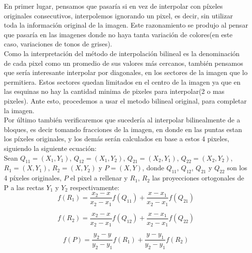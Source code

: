 \documentclass[a4paper]{article}
\newcounter{col}
\begin{document}
En primer lugar, pensamos que pasar\'ia si en vez de interpolar con p\'ixeles originales consecutivos, interpolemos ignorando un pixel, es decir, sin utilizar toda la informaci\'on original de la imagen. Este razonamiento se produjo al pensar que pasar\'ia en las imagenes donde no haya tanta variaci\'on de colores(en este caso, variaciones de tonos de grises).\\
Como la interpretaci\'on del  m\'etodo de interpolaci\'on bilineal es la denominaci\'on de cada pixel como un promedio de sus valores m\'as cercanos, tambi\'en pensamos que ser\'ia interesante interpolar por diagonales, en los sectores de la imagen que lo permitiera. Estos sectores quedan limitados en el centro de la imagen ya que en las esquinas no hay la cantidad minima de pixeles para interpolar(2 o mas pixeles). Ante esto, procedemos a usar el metodo bilineal original, para completar la imagen.\\
Por \'ultimo tambi\'en verificaremos que suceder\'ia al interpolar bilinealmente de a bloques, es decir tomando fracciones de la imagen, en donde en las puntas estan los p\'ixeles originales, y los dem\'as ser\'an calculados en base a estos 4 pixeles, siguiendo la siguiente ecuaci\'on:\\
Sean $Q_{11}=(X_1,Y_1)$, $Q_{12}=(X_1,Y_2)$, $Q_{21}=(X_2,Y_1)$, $Q_{22}=(X_2,Y_2)$, $R_1=(X,Y_1)$, $R_2=(X,Y_2)$ y $P=(X,Y)$, donde $Q_{11}$, $Q_{12}$, $Q_{21}$ y $Q_{22}$ son los 4 p\'ixeles originales, $P$ el pixel a rellenar y $R_1$, $R_2$ las proyecciones ortogonales de P a las rectas $Y_1$ y $Y_2$ respectivamente:\\

\begin{equation}
\texttt{}f(R_1) = \frac{x_2-x}{x_2-x_1} f(Q_{11}) + \frac{x-x_1}{x_2-x_1} f(Q_{21})
\end{equation}

\begin{equation}
\texttt{}f(R_2) = \frac{x_2-x}{x_2-x_1} f(Q_{12}) + \frac{x-x_1}{x_2-x_1} f(Q_{22})
\end{equation}

\begin{equation}
\texttt{}f(P) = \frac{y_2-y}{y_2-y_1} f(R_1) + \frac{y-y_1}{y_2-y_1} f(R_2)
\end{equation}
\end{document}
